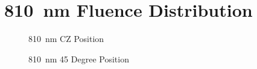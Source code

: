 \documentclass[journal,twoside,web]{ieeecolor}
\begin{document}
\appendices

\section{810~nm Fluence Distribution}
\label{app:810Simulations}
\begin{figure}[htb!]
    \caption{\label{fig:810-CZ} 810~nm CZ Position}
\end{figure}

\begin{figure}[htb!]
    \caption{\label{fig:810-45} 810~nm 45 Degree Position}
\end{figure}
\end{document}

